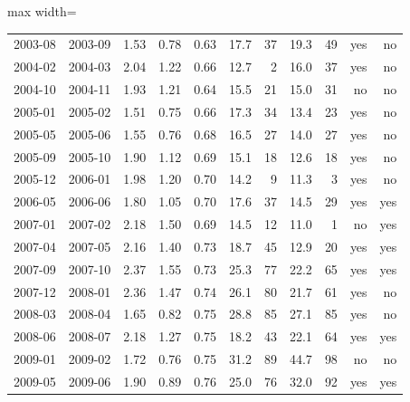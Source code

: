 \begin{table}[H]
\begin{adjustbox}{max width=\linewidth}
\begin{tabular}{lrrrrrrrrrr}
2003-08 & 2003-09 & 1.53 & 0.78 & 0.63 & 17.7 & 37 & 19.3 & 49 & yes & no \\
2004-02 & 2004-03 & 2.04 & 1.22 & 0.66 & 12.7 & 2 & 16.0 & 37 & yes & no \\
2004-10 & 2004-11 & 1.93 & 1.21 & 0.64 & 15.5 & 21 & 15.0 & 31 & no & no \\
2005-01 & 2005-02 & 1.51 & 0.75 & 0.66 & 17.3 & 34 & 13.4 & 23 & yes & no \\
2005-05 & 2005-06 & 1.55 & 0.76 & 0.68 & 16.5 & 27 & 14.0 & 27 & yes & no \\
2005-09 & 2005-10 & 1.90 & 1.12 & 0.69 & 15.1 & 18 & 12.6 & 18 & yes & no \\
2005-12 & 2006-01 & 1.98 & 1.20 & 0.70 & 14.2 & 9 & 11.3 & 3 & yes & no \\
2006-05 & 2006-06 & 1.80 & 1.05 & 0.70 & 17.6 & 37 & 14.5 & 29 & yes & yes \\
2007-01 & 2007-02 & 2.18 & 1.50 & 0.69 & 14.5 & 12 & 11.0 & 1 & no & yes \\
2007-04 & 2007-05 & 2.16 & 1.40 & 0.73 & 18.7 & 45 & 12.9 & 20 & yes & yes \\
2007-09 & 2007-10 & 2.37 & 1.55 & 0.73 & 25.3 & 77 & 22.2 & 65 & yes & yes \\
2007-12 & 2008-01 & 2.36 & 1.47 & 0.74 & 26.1 & 80 & 21.7 & 61 & yes & no \\
2008-03 & 2008-04 & 1.65 & 0.82 & 0.75 & 28.8 & 85 & 27.1 & 85 & yes & no \\
2008-06 & 2008-07 & 2.18 & 1.27 & 0.75 & 18.2 & 43 & 22.1 & 64 & yes & yes \\
2009-01 & 2009-02 & 1.72 & 0.76 & 0.75 & 31.2 & 89 & 44.7 & 98 & no & no \\
2009-05 & 2009-06 & 1.90 & 0.89 & 0.76 & 25.0 & 76 & 32.0 & 92 & yes & yes \\
\bottomrule
\end{tabular}
\end{adjustbox}
\end{table}
